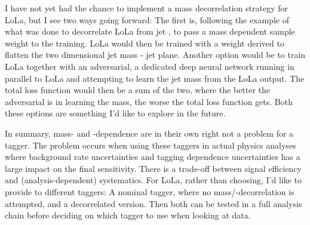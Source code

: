 I have not yet had the chance to implement a mass decorrelation strategy for LoLa, but I see two ways going forward: The first is, following the example of what was done to decorrelate LoLa from jet \PT, to pass a mass dependent sample weight to the training. LoLa would then be trained with a weight derived to flatten the two dimensional jet mass - jet \PT plane. Another option would be to train LoLa together with an adversarial, a dedicated deep neural network running in parallel to LoLa and attempting to learn the jet mass from the LoLa output. The total loss function would then be a sum of the two, where the better the adversarial is in learning the mass, the worse the total loss function gets. Both these options are something I'd like to explore in the future.\par

In summary, mass- and \PT-dependence are in their own right not a problem for a tagger. The problem occurs when using these taggers in actual physics analyses where background rate uncertainties and tagging \PT dependence uncertainties has a large impact on the final sensitivity. There is a trade-off between signal efficiency and (analysis-dependent) systematics. For LoLa, rather than choosing, I'd like to provide to different taggers: A nominal tagger, where no mass/\PT-decorrelation is attempted, and a decorrelated version. Then both can be tested in a full analysis chain before deciding on which tagger to use when looking at data.

